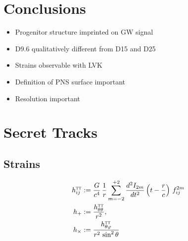 \documentclass[aspectratio=169]{beamer}
\begin{document}
\section{Conclusions}

\begin{frame}

  \begin{itemize}
    \item Progenitor structure imprinted on GW signal
    \item D9.6 qualitatively different from D15 and D25
    \item Strains observable with LVK
    \item Definition of PNS surface important
    \item Resolution important
  \end{itemize}

\end{frame}

\section{Secret Tracks}

\subsection{Strains}

\begin{frame}

  \begin{align*}
    h^{\textsc{tt}}_{ij}
    &:=\frac{G}{c^{4}}\,\frac{1}{r}\sum\limits_{m=-2}^{+2}
    \frac{d^{2}I_{2m}}{dt^{2}}\left(t-\frac{r}{c}\right)\,f^{2m}_{ij}\\
    h_{+}&:=\frac{h_{\theta\theta}^{\textsc{tt}}}{r^{2}},\\
    h_{\times}
    &:=\frac{h_{\theta\varphi}^{\textsc{tt}}}{r^{2}\,\sin^{2}\theta}
  \end{align*}

\end{frame}
\end{document}
